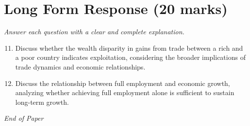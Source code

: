 \documentclass[12pt]{article}
\begin{document}
\section*{Long Form Response (20 marks)}
\textit{Answer each question with a clear and complete explanation.}
\begin{enumerate}[label=\arabic*.]
\setcounter{enumi}{10}
\item Discuss whether the wealth disparity in gains from trade between a rich and a poor country indicates exploitation, considering the broader implications of trade dynamics and economic relationships.
\item Discuss the relationship between full employment and economic growth, analyzing whether achieving full employment alone is sufficient to sustain long-term growth.
\end{enumerate}

\vfill
\noindent\textit{End of Paper}
\end{document}
